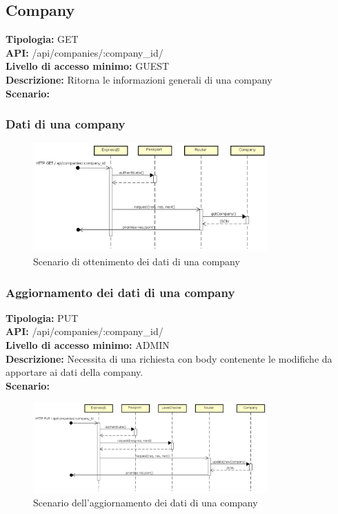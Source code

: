 \newpage
\subsection{Company}
\textbf{Tipologia:} GET \\
\textbf{API:} /api/companies/:company\_id/ \\
\textbf{Livello di accesso minimo:} GUEST \\
\textbf{Descrizione:} Ritorna le informazioni generali di una company \\
\textbf{Scenario:} 
\subsubsection{Dati di una company}
\begin{figure}[h]
\centering
\includegraphics[width=0.8\textwidth]{res/sections/backend/(GET)company.png}
\caption{Scenario di ottenimento dei dati di una company}
\end{figure}

\newpage
\subsubsection{Aggiornamento dei dati di una company}
\textbf{Tipologia:} PUT \\
\textbf{API:} /api/companies/:company\_id/ \\
\textbf{Livello di accesso minimo:} ADMIN \\
\textbf{Descrizione:} Necessita di una richiesta con body contenente le modifiche da apportare ai dati della company. \\
\textbf{Scenario:} 
\begin{figure}[h]
\centering
\includegraphics[width=0.8\textwidth]{res/sections/backend/(PUT)company.png}
\caption{Scenario dell'aggiornamento dei dati di una company}
\end{figure}

